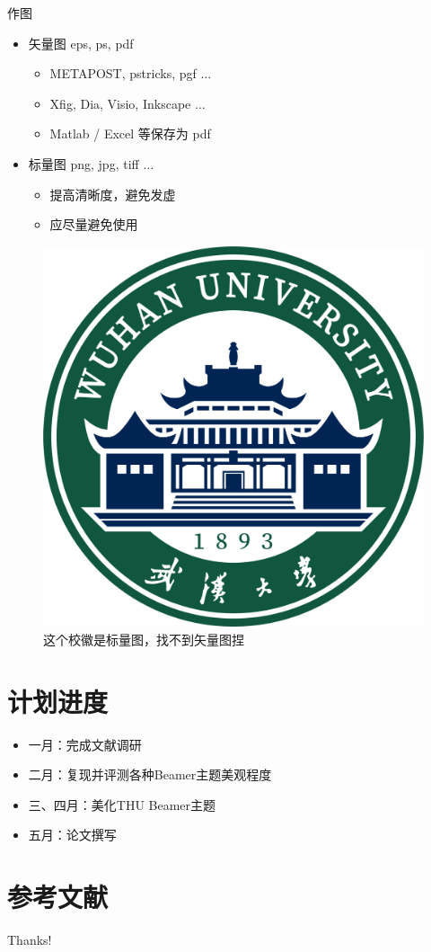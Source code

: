 \documentclass{beamer}
\begin{document}
\begin{frame}{作图}
    \begin{itemize}
        \item 矢量图 eps, ps, pdf
        \begin{itemize}
            \item METAPOST, pstricks, pgf $\ldots$
            \item Xfig, Dia, Visio, Inkscape $\ldots$
            \item Matlab / Excel 等保存为 pdf
        \end{itemize}
        \item 标量图 png, jpg, tiff $\ldots$
        \begin{itemize}
            \item 提高清晰度，避免发虚
            \item 应尽量避免使用
        \end{itemize}
    \end{itemize}
    \begin{figure}[htpb]
        \centering
        \includegraphics[width=0.2\linewidth]{pic/whulogo.png}
        \caption{这个校徽是标量图，找不到矢量图捏}
    \end{figure}
\end{frame}

\section{计划进度}
\begin{frame}
    \begin{itemize}
        \item 一月：完成文献调研
        \item 二月：复现并评测各种Beamer主题美观程度
        \item 三、四月：美化THU Beamer主题
        \item 五月：论文撰写
    \end{itemize}
\end{frame}

\section{参考文献}

\begin{frame}[allowframebreaks]
    
    
\end{frame}

\begin{frame}
    \begin{center}
        {\Huge\calligra Thanks!}
    \end{center}
\end{frame}
\end{document}
